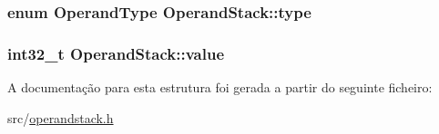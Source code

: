 \subsubsection[{\texorpdfstring{type}{type}}]{\setlength{\rightskip}{0pt plus 5cm}enum {\bf Operand\+Type} Operand\+Stack\+::type}\hypertarget{structOperandStack_a757f9fff730b28c1df05b0226d93416f}{}\label{structOperandStack_a757f9fff730b28c1df05b0226d93416f}
\subsubsection[{\texorpdfstring{value}{value}}]{\setlength{\rightskip}{0pt plus 5cm}int32\+\_\+t Operand\+Stack\+::value}\hypertarget{structOperandStack_a931d181370bfdb5b41edb8fe488c3b90}{}\label{structOperandStack_a931d181370bfdb5b41edb8fe488c3b90}


A documentação para esta estrutura foi gerada a partir do seguinte ficheiro\+:\begin{DoxyCompactItemize}
\item 
src/\hyperlink{operandstack_8h}{operandstack.\+h}\end{DoxyCompactItemize}
